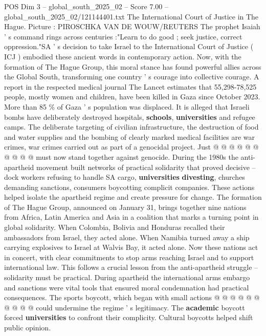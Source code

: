 \begin{textsample}{POS Dim 3 – global\_south\_2025\_02 – Score 7.00 – global\_south\_2025\_02/121144401.txt}  \label{ex:f3_pos_441}
The International Court of Justice in The Hague.
Picture : PIROSCHKA VAN DE WOUW/REUTERS The prophet Isaiah ' s command rings across centuries :"Learn to do good ; seek justice, correct oppression."SA ' s decision to take Israel to the International Court of Justice ( ICJ ) embodied these ancient words in contemporary action.
Now, with the formation of The Hague Group, this moral stance has found powerful allies across the Global South, transforming one country ' s courage into collective courage.
A report in the respected medical journal The Lancet estimates that 55,298-78,525 people, mostly women and children, have been killed in Gaza since October 2023.
More than 85 \% of Gaza ' s population was displaced.
It is alleged that Israeli bombs have deliberately destroyed hospitals, \textbf{schools}, \textbf{universities} and refugee camps.
The deliberate targeting of civilian infrastructure, the destruction of food and water supplies and the bombing of clearly marked medical facilities are war crimes, war crimes carried out as part of a genocidal project.
Just @ @ @ @ @ @ @ @ @ @ must now stand together against genocide.
During the 1980s the anti-apartheid movement built networks of practical solidarity that proved decisive -- dock workers refusing to handle SA cargo, \textbf{universities} \textbf{divesting}, churches demanding sanctions, consumers boycotting complicit companies.
These actions helped isolate the apartheid regime and create pressure for change.
The formation of The Hague Group, announced on January 31, brings together nine nations from Africa, Latin America and Asia in a coalition that marks a turning point in global solidarity.
When Colombia, Bolivia and Honduras recalled their ambassadors from Israel, they acted alone.
When Namibia turned away a ship carrying explosives to Israel at Walvis Bay, it acted alone.
Now these nations act in concert, with clear commitments to stop arms reaching Israel and to support international law.
This follows a crucial lesson from the anti-apartheid struggle -- solidarity must be practical.
During apartheid the international arms embargo and sanctions were vital tools that ensured moral condemnation had practical consequences.
The sports boycott, which began with small actions @ @ @ @ @ @ @ @ @ @ could undermine the regime ' s legitimacy.
The \textbf{academic} boycott forced \textbf{universities} to confront their complicity.
Cultural boycotts helped shift public opinion.

\end{textsample}
